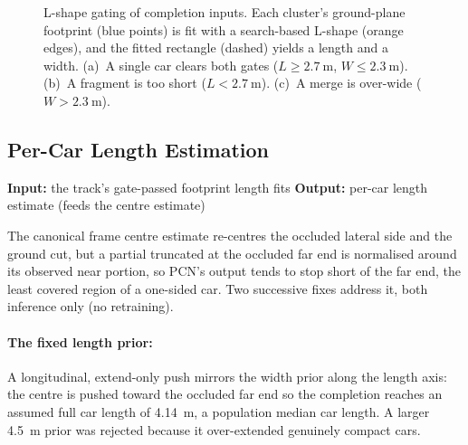 \begin{figure}[H]
  \caption[L-shape gating of completion inputs]{L-shape gating of completion inputs. Each
    cluster's ground-plane footprint (blue points) is fit with a search-based L-shape (orange
    edges), and the fitted rectangle (dashed) yields a length and a width. (a)~A single car
    clears both gates ($L\ge\SI{2.7}{\meter}$, $W\le\SI{2.3}{\meter}$). (b)~A fragment is too
    short ($L<\SI{2.7}{\meter}$). (c)~A merge is over-wide ($W>\SI{2.3}{\meter}$).}
  \label{fig:lshape-gate}
\end{figure}

\subsection{Per-Car Length Estimation}
\label{sec:completion-length}

\noindent \textbf{Input:} the track's gate-passed footprint length fits \quad \textbar \quad \textbf{Output:} per-car length estimate (feeds the centre estimate) \vspace{0.5em}

The canonical frame centre estimate re-centres the occluded lateral side and the
ground cut, but a partial truncated at the occluded far end is normalised
around its observed near portion, so PCN's output tends to stop short of the far end,
the least covered region of a one-sided car. Two successive fixes address it, both
inference only (no retraining).

\paragraph{The fixed length prior:} A longitudinal, extend-only
push mirrors the width prior along the length axis: the centre is pushed toward
the occluded far end so the completion reaches an assumed full car length of
\SI{4.14}{\meter}, a population median car length. A larger \SI{4.5}{\meter} prior
was rejected because it over-extended genuinely compact cars.

